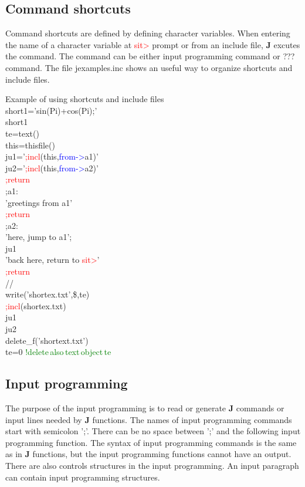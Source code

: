 \subsection{Command shortcuts}
\label{short}
Command shortcuts are defined by defining character variables. When entering the
name of a character variable at \textcolor{Red}{sit>} prompt or from an include file, \textbf{J} excutes the command.
The command can be either input programming command or ??? command. The file jexamples.inc
shows an useful way to organize shortcuts and include files.
\begin{example}[shortex]Example of using shortcuts and include files\\
\label{shortex}
short1='\textcolor{VioletRed}{sin}(Pi)+\textcolor{VioletRed}{cos}(Pi);'\\
short1\\
te=\textcolor{VioletRed}{text}()\\
this=\textcolor{VioletRed}{thisfile}()\\
ju1='\textcolor{Red}{;incl}(this,\textcolor{blue}{from->}a1)'\\
ju2='\textcolor{Red}{;incl}(this,\textcolor{blue}{from->}a2)'\\
\textcolor{Red}{;return}\\
;a1:\\
'greetings from a1'\\
\textcolor{Red}{;return}\\
;a2:\\
'here, jump to a1';\\
ju1\\
'back here, return to \textcolor{Red}{sit>}'\\
\textcolor{Red}{;return}\\
//\\
\textcolor{VioletRed}{write}('shortex.txt',\$,te)\\
\textcolor{Red}{;incl}(shortex.txt)\\
ju1\\
ju2\\
delete\_f('shortext.txt')\\
te=0 \textcolor{green}{!delete\,also\,text\,object\,te}
\end{example}
\subsection{Input programming}
\label{inpuprog}
The purpose of the input programming is to read or generate \textbf{J} commands or input lines
needed by \textbf{J} functions. The names of input programming commands start with semicolon ';'.
There can be no space between ';' and the following input programming function. The syntax
of input programming commands is the same as in \textbf{J} functions, but the input programming
functions cannot have an output. There are also controls structures in the input programming.
An input paragraph can contain input programming structures.
